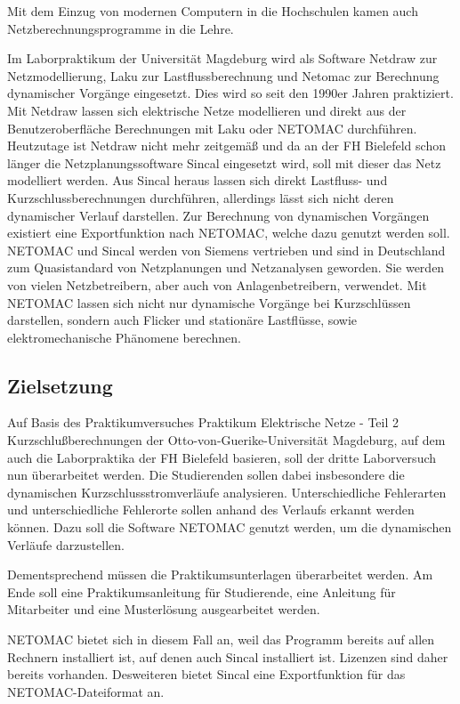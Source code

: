 \documentclass{scrartcl}
\begin{document}
\begin{onehalfspace}
Mit dem Einzug von modernen Computern in die Hochschulen kamen auch Netzberechnungsprogramme in die Lehre.

Im Laborpraktikum der Universität Magdeburg wird als Software Netdraw zur Netzmodellierung, Laku zur Lastflussberechnung und Netomac zur Berechnung dynamischer Vorgänge eingesetzt. Dies wird so seit den 1990er Jahren praktiziert. Mit Netdraw lassen sich elektrische Netze modellieren und direkt aus der Benutzeroberfläche Berechnungen mit Laku oder NETOMAC durchführen.
Heutzutage ist Netdraw nicht mehr zeitgemäß und da an der FH Bielefeld schon länger die Netzplanungssoftware Sincal eingesetzt wird, soll mit dieser das Netz modelliert werden. Aus Sincal heraus lassen sich direkt Lastfluss- und Kurzschlussberechnungen durchführen, allerdings lässt sich nicht deren dynamischer Verlauf darstellen. Zur Berechnung von dynamischen Vorgängen existiert eine Exportfunktion nach NETOMAC, welche dazu genutzt werden soll. NETOMAC und Sincal werden von Siemens vertrieben und sind in Deutschland zum Quasistandard von Netzplanungen und Netzanalysen geworden. Sie werden von vielen Netzbetreibern, aber auch von Anlagenbetreibern, verwendet. Mit NETOMAC lassen sich nicht nur dynamische Vorgänge bei Kurzschlüssen darstellen, sondern auch Flicker und stationäre Lastflüsse, sowie elektromechanische Phänomene berechnen.
 
\subsection{Zielsetzung}
Auf Basis des Praktikumversuches \glqq Praktikum Elektrische Netze - Teil 2 Kurzschlußberechnungen\grqq{} der Otto-von-Guerike-Universität Magdeburg, auf dem auch die Laborpraktika der FH Bielefeld basieren, soll der dritte Laborversuch nun überarbeitet werden. Die Studierenden sollen dabei insbesondere die dynamischen Kurzschlussstromverläufe analysieren. Unterschiedliche Fehlerarten und unterschiedliche Fehlerorte sollen anhand des Verlaufs erkannt werden können. Dazu soll die Software NETOMAC genutzt werden, um die dynamischen Verläufe darzustellen.

Dementsprechend müssen die Praktikumsunterlagen überarbeitet werden. Am Ende soll eine Praktikumsanleitung für Studierende, eine Anleitung für Mitarbeiter und eine Musterlösung ausgearbeitet werden.

NETOMAC bietet sich in diesem Fall an, weil das Programm bereits auf allen Rechnern installiert ist, auf denen auch Sincal installiert ist. Lizenzen sind daher bereits vorhanden. Desweiteren bietet Sincal eine Exportfunktion für das NETOMAC-Dateiformat an.


\end{onehalfspace}
\end{document}
